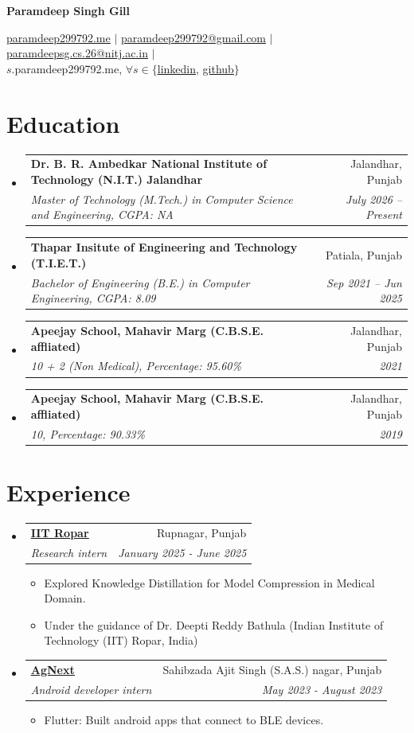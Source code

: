 \documentclass[letterpaper,11pt]{article}
\makeatletter
\newcommand{\resumeItem}[1]{
  \item\small{
    {#1 \vspace{-2pt}}
  }
}
\newcommand{\resumeSubheading}[4]{
  \vspace{-2pt}\item
    \begin{tabular*}{0.97\textwidth}[t]{l@{\extracolsep{\fill}}r}
      \textbf{#1} & #2 \\
      \textit{\small#3} & \textit{\small #4} \\
    \end{tabular*}\vspace{-7pt}
}
\newcommand{\resumeSubHeadingListStart}{\begin{itemize}[leftmargin=0.15in, label={}]}
\newcommand{\resumeSubHeadingListEnd}{\end{itemize}}
\newcommand{\resumeItemListStart}{\begin{itemize}}
\newcommand{\resumeItemListEnd}{\end{itemize}\vspace{-5pt}}
\makeatother
\begin{document}
\begin{center}
    \textbf{\Huge Paramdeep Singh Gill}
\end{center}

\begin{center}   
\href{https://paramdeep299792.me/}{\underline{paramdeep299792.me}} $|$
\href{mailto:paramdeep299792@gmail.com}{\underline{paramdeep299792@gmail.com}} $|$
\href{mailto:paramdeepsg.cs.26@nitj.ac.in}{\underline{paramdeepsg.cs.26@nitj.ac.in}} $|$ \\
$s$.paramdeep299792.me, $\forall s \in \{$\href{https://linkedin.paramdeep299792.me/}{\underline{linkedin}}, \href{https://github.paramdeep299792.me/}{\underline{github}}$\}$
\end{center}


\section{Education}
  \resumeSubHeadingListStart
      \resumeSubheading
      {Dr. B. R. Ambedkar National Institute of Technology (N.I.T.) Jalandhar}{Jalandhar, Punjab}
      {Master of Technology (M.Tech.) in Computer Science and Engineering, CGPA: NA}{July 2026 -- Present}
      \resumeSubheading
      {Thapar Insitute of Engineering and Technology (T.I.E.T.)}{Patiala, Punjab}
      {Bachelor of Engineering (B.E.) in Computer Engineering, CGPA: 8.09}{Sep 2021 -- Jun 2025}
      \resumeSubheading
      {Apeejay School, Mahavir Marg (C.B.S.E. affliated)}{Jalandhar, Punjab}
      {10 + 2 (Non Medical), Percentage: 95.60\%}{2021}
      \resumeSubheading
      {Apeejay School, Mahavir Marg (C.B.S.E. affliated)}{Jalandhar, Punjab}
      {10, Percentage: 90.33\%}{2019}
    \resumeSubHeadingListEnd

\section{Experience}
  \resumeSubHeadingListStart
      \resumeSubheading
      {\href{https://www.iitrpr.ac.in/}{\underline{IIT Ropar}}}{Rupnagar, Punjab}
      {Research intern}{January 2025 - June 2025}
            \resumeItemListStart
                \resumeItem{Explored Knowledge Distillation for Model Compression in Medical Domain.}
                \resumeItem{Under the guidance of Dr. Deepti Reddy Bathula (Indian Institute of Technology (IIT) Ropar, India)}
              \resumeItemListEnd
            \resumeSubheading
      {\href{https://agnext.com/}{\underline{AgNext}}}{Sahibzada Ajit Singh (S.A.S.) nagar, Punjab}
      {Android developer intern}{May 2023 - August 2023}
            \resumeItemListStart
                \resumeItem{Flutter: Built android apps that connect to BLE devices.}
              \resumeItemListEnd
          \resumeSubHeadingListEnd
\end{document}
